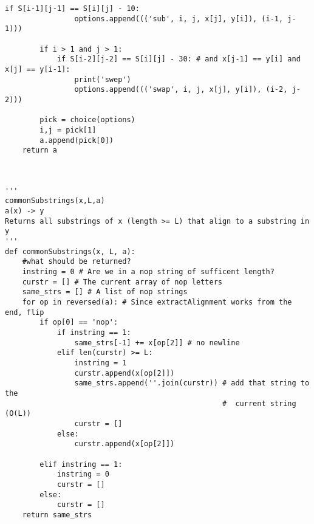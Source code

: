 \documentclass[12pt]{article}
\begin{document}
\begin{Verbatim}[fontsize=\small]
            if S[i-1][j-1] == S[i][j] - 10:
                options.append((('sub', i, j, x[j], y[i]), (i-1, j-1)))

        if i > 1 and j > 1:
            if S[i-2][j-2] == S[i][j] - 30: # and x[j-1] == y[i] and x[j] == y[i-1]:
                print('swep')
                options.append((('swap', i, j, x[j], y[i]), (i-2, j-2)))
        
        pick = choice(options)
        i,j = pick[1]
        a.append(pick[0])
    return a



'''
commonSubstrings(x,L,a)
a(x) -> y
Returns all substrings of x (length >= L) that align to a substring in y
'''
def commonSubstrings(x, L, a):
    #what should be returned?
    instring = 0 # Are we in a nop string of sufficent length?
    curstr = [] # The current array of nop letters
    same_strs = [] # A list of nop strings
    for op in reversed(a): # Since extractAlignment works from the end, flip
        if op[0] == 'nop':
            if instring == 1:
                same_strs[-1] += x[op[2]] # no newline
            elif len(curstr) >= L:
                instring = 1
                curstr.append(x[op[2]])
                same_strs.append(''.join(curstr)) # add that string to the 
                                                  #  current string (O(L))
                curstr = []
            else:
                curstr.append(x[op[2]])

        elif instring == 1:
            instring = 0
            curstr = []
        else:
            curstr = []
    return same_strs
\end{Verbatim}
\end{document}
